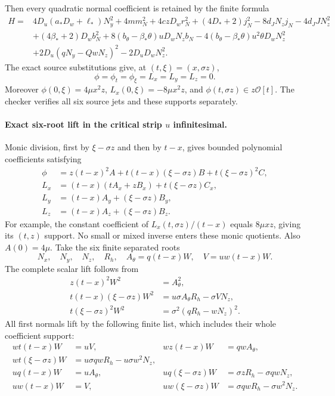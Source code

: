 Then every quadratic normal coefficient is retained by the finite formula
\begin{align*}
H={}&4D_u(a_*D_w+\ell_*)N_y^2+4mm_N^2+4czD_wr_N^2
 +(4D_*+2)j_N^2-8d_JN_zj_N-4d_JJN_z^2\\
&+(4\beta_*+2)D_wb_N^2+8(b_\theta-\beta_*\theta)uD_wN_zb_N
 -4(b_\theta-\beta_*\theta)u^2\theta D_wN_z^2\\
&+2D_u(qN_y-QwN_z)^2-2D_uD_wN_z^2.
\end{align*}
The exact source substitutions give, at $(t,\xi)=(x,\sigma z)$,
\[
\phi=\phi_t=\phi_\xi=L_x=L_y=L_z=0.
\]
Moreover $\phi(0,\xi)=4\mu x^2z$,
$L_x(0,\xi)=-8\mu x^2z$, and $\phi(t,\sigma z)\in z\mathcal O[t]$.
The checker verifies all six source jets and these supports separately.

\paragraph{Exact six-root lift in the critical strip $u$ infinitesimal.}
Monic division, first by $\xi-\sigma z$ and then by $t-x$, gives bounded
polynomial coefficients satisfying
\begin{align*}
\phi&=z(t-x)^2 A+t(t-x)(\xi-\sigma z)B+t(\xi-\sigma z)^2C,\\
L_x&=(t-x)(tA_x+zB_x)+t(\xi-\sigma z)C_x,\\
L_y&=(t-x)A_y+(\xi-\sigma z)B_y,\\
L_z&=(t-x)A_z+(\xi-\sigma z)B_z.
\end{align*}
For example, the constant coefficient of
$L_x(t,\sigma z)/(t-x)$ equals $8\mu xz$, giving its $(t,z)$ support.
No small or mixed inverse enters these monic quotients. Also $A(0)=4\mu$.
Take the six finite separated roots
\[
 N_x,\quad N_y,\quad N_z,\quad R_h,\quad
 A_\theta=q(t-x)W,\quad V=uw(t-x)W.
\]
The complete scalar lift follows from
\begin{align*}
 z(t-x)^2W^2&=A_\theta^2,\\
 t(t-x)(\xi-\sigma z)W^2&=u\sigma A_\theta R_h-\sigma VN_z,\\
 t(\xi-\sigma z)^2W^2&=\sigma^2(qR_h-wN_z)^2.
\end{align*}
All first normals lift by the following finite list, which includes their
whole coefficient support:
\begin{align*}
wt(t-x)W&=uV,&wz(t-x)W&=qwA_\theta,\\
wt(\xi-\sigma z)W&=u\sigma qwR_h-u\sigma w^2N_z,\\
uq(t-x)W&=uA_\theta,&uq(\xi-\sigma z)W&=\sigma zR_h-\sigma qwN_z,\\
uw(t-x)W&=V,&uw(\xi-\sigma z)W&=\sigma qwR_h-\sigma w^2N_z.
\end{align*}
